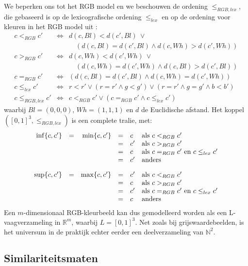 We beperken ons tot het RGB model en we beschouwen de ordening $\leq_{RGB,lex}$, die
gebaseerd is op de lexicografische ordening $\leq_{lex}$ en op de ordening voor kleuren in het 
RGB model uit \cite{dewitte:vect_morph_ops}:
$$
\begin{array}{rcl}
c <_{RGB} c' & \iff & d(c,Bl) < d(c',Bl)\ \lor \\
			   &	  & \quad(d(c,Bl) = d(c',Bl) \land d(c,Wh) > d(c',Wh)) \\[5pt]
c >_{RGB} c' & \iff & d(c,Wh) < d(c',Wh)\ \lor \\
			   &	  & \quad(d(c,Wh) = d(c',Wh) \land d(c,Bl) > d(c',Bl)) \\[5pt]
c =_{RGB} c'   & \iff & (d(c,Bl) = d(c',Bl) \land d(c,Wh) = d(c',Wh)) \\[10pt]
c \leq_{lex} c' & \iff & r < r' \lor (r = r' \land g < g') \lor (r = r' \land g = g' \land b < b') \\[10pt]
c \leq_{RGB,lex} c' & \iff & c <_{RGB} c' \lor (c =_{RGB} c' \land c \leq_{lex} c')
\end{array}
$$
waarbij $Bl = (0,0,0)$, $Wh = (1,1,1)$ en $d$ de Euclidische afstand.
Het koppel $([0,1]^3,\leq_{RGB,lex})$ is een complete tralie, met:
$$
\begin{array}{@{}c@{}}
\begin{array}{rcrcll}
\inf \{c,c'\} & = & \min \{c,c'\} & = & c & \textrm{als } c <_{RGB} c' \\
		  	& & & = & c' & \textrm{als } c >_{RGB} c' \\
		  	& & & = & c & \textrm{als } c =_{RGB} c' \textrm{ en } c \leq_{lex} c' \\
		  	& & & = & c' & \textrm{anders} \\[10pt]
\sup \{c,c'\} & = & \max \{c,c'\} & = & c' & \textrm{als } c <_{RGB} c' \\
		  	& & & = & c & \textrm{als } c >_{RGB} c' \\
		  	& & & = & c' & \textrm{als } c =_{RGB} c' \textrm{ en } c \leq_{lex} c' \\
		  	& & & = & c & \textrm{anders}
\end{array}
\end{array}
$$
Een $m$-dimensionaal RGB-kleurbeeld kan dus gemodelleerd worden als een L-vaagverzameling in 
$\mathbb{R}^m$, waarbij $L=[0,1]^3$. Net zoals bij grijswaardebeelden, is 
het universum in de praktijk echter eerder een deelverzameling van $\mathbb{N}^2$.

\subsection{Similariteitsmaten}

